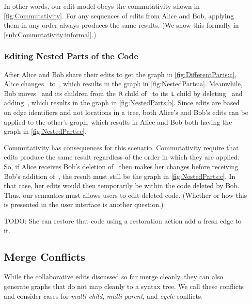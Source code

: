 In other words, our edit model obeys the commutativity shown in \autoref{fig:Commutativity}.
For any sequences of edits from Alice and Bob,
applying them in any order always produces the same results.
(We show this formally in \autoref{sub:Commutativity:informal}.)


\subsubsection{Editing Nested Parts of the Code}%
\label{sub:Editing Nested Parts of the Code}

After Alice and Bob share their edits to get the graph in \autoref{fig:DifferentParts:c},
Alice changes~\vDifferentPartsAlice{} to~\vNestedPartsAlice{}, which results in the graph in \autoref{fig:NestedParts:a}.
Meanwhile, Bob moves~\vSimpleTimes{} and its children from the~\texttt{R} child of~\vWrapPlus{} to its~\texttt{L} child
by deleting~\eMoveTimes{} and adding~\eNestedPartsBob{}, which results in the graph in \autoref{fig:NestedParts:b}.
Since edits are based on edge identifiers and not locations in a tree,
both Alice's and Bob's edits can be applied to the other's graph,
which results in Alice and Bob both having the graph in \autoref{fig:NestedParts:c}.

Commutativity has consequences for this scenario.
Commutativity require that edits produce the same result regardless of the order in which they are applied.
So, if Alice receives Bob's deletion of~\eMoveTimes{} then makes her
changes before receiving Bob's addition of~\eNestedPartsBob{},
the result must still be the graph in \autoref{fig:NestedParts:c}.
In that case, her edits would then temporarily be within the code deleted by Bob.
Thus, our semantics must allows users to edit deleted code.
(Whether or how this is presented in the user interface is another question.)

TODO: She can restore that code using a restoration action add a fresh edge to it.

\subsection{Merge Conflicts}%
\label{sub:Merge Conflicts}

While the collaborative edits discussed so far merge cleanly,
they can also generate graphs that do not map cleanly to a syntax tree.
We call these conflicts and consider cases for \emph{multi-child},
\emph{multi-parent}, and \emph{cycle} conflicts.

